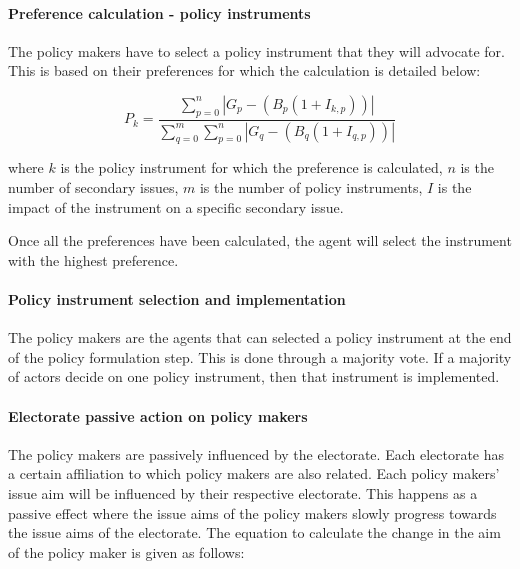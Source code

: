 \documentclass[11pt]{article}
\begin{document}
\paragraph{Preference calculation - policy instruments}

The policy makers have to select a policy instrument that they will advocate for. This is based on their preferences for which the calculation is detailed below:

\begin{equation}
P_k = \frac{\sum_{p = 0}^{n} | G_{p} - \left( B_{p} (1 + I_{k,p}) \right) |}{\sum_{q = 0}^{m} \sum_{p = 0}^{n} | G_{q} - \left( B_{q} (1 + I_{q,p}) \right) |}
\end{equation}

where $k$ is the policy instrument for which the preference is calculated, $n$ is the number of secondary issues, $m$ is the number of policy instruments, $I$ is the impact of the instrument on a specific secondary issue.

Once all the preferences have been calculated, the agent will select the instrument with the highest preference.


\paragraph{Policy instrument selection and implementation}

The policy makers are the agents that can selected a policy instrument at the end of the policy formulation step. This is done through a majority vote. If a majority of actors decide on one policy instrument, then that instrument is implemented.


\paragraph{Electorate passive action on policy makers}

The policy makers are passively influenced by the electorate. Each electorate has a certain affiliation to which policy makers are also related. Each policy makers' issue aim will be influenced by their respective electorate. This happens as a passive effect where the issue aims of the policy makers slowly progress towards the issue aims of the electorate. The equation to calculate the change in the aim of the policy maker is given as follows:
\end{document}
